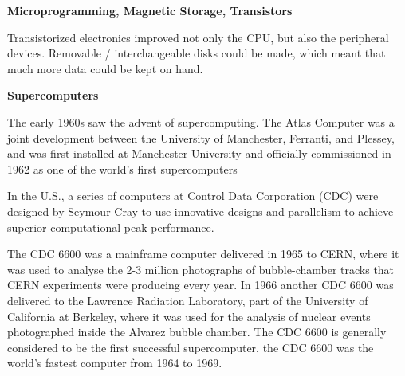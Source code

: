 \documentclass[12pt, ]{article}
\begin{document}
\vspace*{2em}
\noindent \textbf{Microprogramming, Magnetic Storage, Transistors}

Transistorized electronics improved not only the CPU, but also the peripheral devices. Removable / interchangeable disks could be made, which meant that much more data could be kept on hand.

\vspace*{2em}
\noindent \textbf{Supercomputers}

The early 1960s saw the advent of supercomputing. The Atlas Computer was a joint development between the University of Manchester, Ferranti, and Plessey, and was first installed at Manchester University and officially commissioned in 1962 as one of the world's first supercomputers%

In the U.S., a series of computers at Control Data Corporation (CDC) were designed by Seymour Cray to use innovative designs and parallelism to achieve superior computational peak performance.

The CDC 6600 was a mainframe computer delivered in 1965 to CERN, where it was used to analyse the 2-3 million photographs of bubble-chamber tracks that CERN experiments were producing every year. In 1966 another CDC 6600 was delivered to the Lawrence Radiation Laboratory, part of the University of California at Berkeley, where it was used for the analysis of nuclear events photographed inside the Alvarez bubble chamber. The CDC 6600 is generally considered to be the first successful supercomputer. the CDC 6600 was the world's fastest computer from 1964 to 1969.
\end{document}
